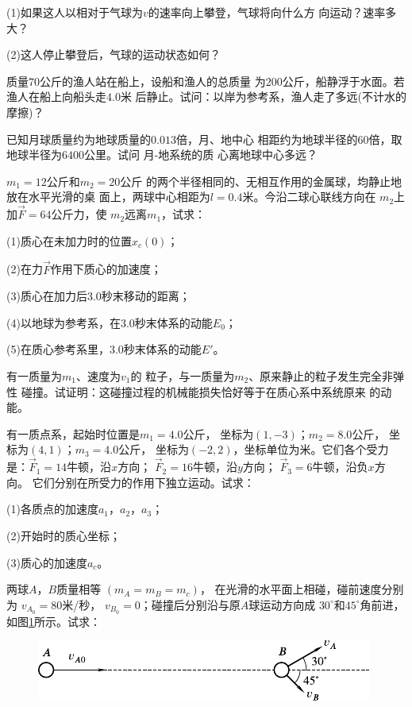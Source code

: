\begin{exercises}
(1)如果这人以相对于气球为$ v $的速率向上攀登，气球将向什么方
向运动？速率多大？

(2)这人停止攀登后，气球的运动状态如何？

\exercise 质量$ 70 $公斤的渔人站在船上，设船和渔人的总质量
为$ 200 $公斤，船静浮于水面。若渔人在船上向船头走$ 4.0 $米
后静止。试问：以岸为参考系，渔人走了多远(不计水的摩擦)？

\exercise 已知月球质量约为地球质量的$ 0.013 $倍，月、地中心
相距约为地球半径的$ 60 $倍，取地球半径为$ 6400 $公里。试问
月-地系统的质
心离地球中心多远？

\exercise \;$ m _ { 1 } = 12 $公斤和$ m _ { 2 } = 20 $公斤
的两个半径相同的、无相互作用的金属球，均静止地放在水平光滑的桌
面上，两球中心相距为$ l = 0.4 $米。今沿二球心联线方向在
$ m _ { 2 } $上加$ \vec { F } = 64 $公斤力，使
$ m _ { 2 } $远离$ m _ { 1 } $，试求：

(1)质心在未加力时的位置$ x _ { c } \left( 0 \right) $；

(2)在力$ \vec { F } $作用下质心的加速度；

(3)质心在加力后$ 3.0 $秒末移动的距离；

(4)以地球为参考系，在$ 3.0 $秒末体系的动能$ E _ { 0 } $；

(5)在质心参考系里，$ 3.0 $秒末体系的动能$ E ' $。

\exercise 有一质量为$ m _ { 1 } $、速度为$ v _ { 1 } $的
粒子，与一质量为$ m _ { 2 } $、原来静止的粒子发生完全非弹性
碰撞。试证明：这碰撞过程的机械能损失恰好等于在质心系中系统原来
的动能。

\exercise 有一质点系，起始时位置是$ m _ { 1 } = 4.0 $公斤，
坐标为$ \left( 1 , -3 \right) $；$ m _ { 2 } = 8.0 $公斤，
坐标为$ \left( 4 , 1 \right) $；$ m _ { 3 } = 4.0 $公斤，
坐标为$ \left( -2 , 2 \right) $，坐标单位为米。它们各个受力
是：$ \vec { F } _ { 1 } = 14 $牛顿，沿$ x $方向；
$ \vec { F } _ { 2 } = 16 $牛顿，沿$ y $方向；
$ \vec { F } _ { 3 } = 6 $牛顿，沿负$ x $方向。
它们分别在所受力的作用下独立运动。试求：

(1)各质点的加速度$ a _ { 1 } $，$ a _ { 2 } $，$ a _ { 3 } $；

(2)开始时的质心坐标；

(3)质心的加速度$ a _ { c } $。

\exercise 两球$ A $，$ B $质量相等
$ \left( m _ { A } = m _ { B } = m _ { c } \right) $，
在光滑的水平面上相碰，碰前速度分别为
$ v _ { A _ { 0 } } = 80 $米/秒，
$ v _ { B _ { 0 } } = 0 $；碰撞后分别沿与原$ A $球运动方向成
$ 30 ^ \circ $和$ 45 ^ { \circ } $角前进，如图\ref{fig:08.12}所示。试求：
\begin{figure}[h]
  \vspace{-0.5em}
  \centering
  \includegraphics{figure/fig08.12}
  \vspace{-0.5em}
  \caption{}
  \label{fig:08.12}
\end{figure}


\end{exercises}
